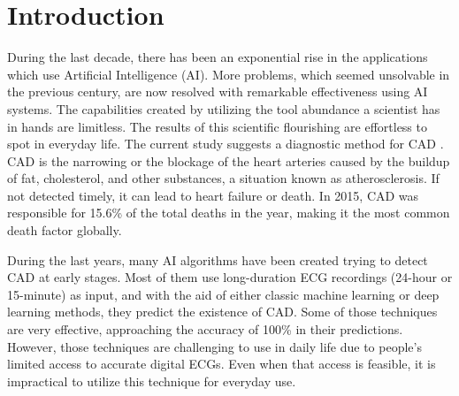 \section{Introduction}
\label{sec:intro}
During the last decade, there has been an exponential rise in the applications which use Artificial Intelligence (AI). More problems, which seemed unsolvable in the previous century, are now resolved with remarkable effectiveness using AI systems. The capabilities created by utilizing the tool abundance a scientist has in hands are limitless. The results of this scientific flourishing are effortless to spot in everyday life.
The current study suggests a diagnostic method for CAD \cite{CAD_article}. CAD is the narrowing or the blockage of the heart arteries caused by the buildup of fat, cholesterol, and other substances, a situation known as atherosclerosis. If not detected timely, it can lead to heart failure or death. In 2015, CAD was responsible for 15.6\% of the total deaths in the year, making it the most common death factor globally.

During the last years, many AI algorithms have been created trying to detect CAD at early stages. Most of them use long-duration ECG recordings (24-hour or 15-minute) as input, and with the aid of either classic machine learning or deep learning methods, they predict the existence of CAD.
Some of those techniques are very effective, approaching the accuracy of 100\% in their predictions. However, those techniques are challenging to use in daily life due to people's limited access to accurate digital ECGs. Even when that access is feasible, it is impractical to utilize this technique for everyday use.

